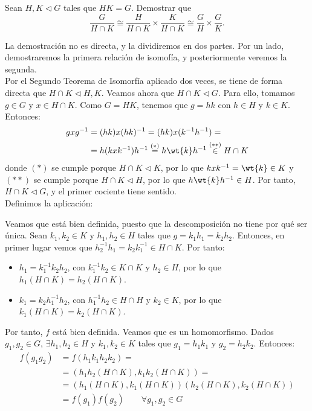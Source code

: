 \begin{ejercicio}
    Sean $H,K\lhd G$ tales que $HK=G$. Demostrar que
    \[
        \frac{G}{H\cap K}\cong \frac{H}{H\cap K}\times \frac{K}{H\cap K}\cong \frac{G}{H}\times \frac{G}{K}.
    \]

    La demostración no es directa, y la dividiremos en dos partes. Por un lado, demostraremos la primera relación de isomofía, y posteriormente veremos la segunda.\\

    Por el Segundo Teorema de Isomorfía aplicado dos veces, se tiene de forma directa que $H\cap K\lhd H,K$. Veamos ahora que $H\cap K\lhd G$. Para ello, tomamos $g\in G$ y $x\in H\cap K$. Como $G=HK$, tenemos que $g=hk$ con $h\in H$ y $k\in K$. Entonces:
    \begin{align*}
        gxg^{-1} &= (hk)x(hk)^{-1} = (hk)x(k^{-1}h^{-1}) =\\&= h(kxk^{-1})h^{-1} \stackrel{(\ast)}{=} h\wt{k}h^{-1}\stackrel{(\ast\ast)}{\in} H\cap K
    \end{align*}
    donde $(\ast)$ se cumple porque $H\cap K\lhd K$, por lo que $kxk^{-1}=\wt{k}\in K$ y $(\ast\ast)$ se cumple porque $H\cap K\lhd H$, por lo que $h\wt{k}h^{-1}\in H$. Por tanto, $H\cap K\lhd G$, y el primer cociente tiene sentido.\\

    Definimos la aplicación:

    Veamos que está bien definida, puesto que la descomposición no tiene por qué ser única. Sean $k_1,k_2\in K$ y $h_1,h_2\in H$ tales que $g=k_1h_1=k_2h_2$. Entonces, en primer lugar vemos que $h_2^{-1}h_1 = k_2k_1^{-1}\in H\cap K$. Por tanto:
    \begin{itemize}
        \item $h_1=k_1^{-1}k_2h_2$, con $k_1^{-1}k_2\in K\cap K$ y $h_2\in H$, por lo que $h_1(H\cap K)=h_2(H\cap K)$.
        \item $k_1=k_2h_1^{-1}h_2$, con $h_1^{-1}h_2\in H\cap H$ y $k_2\in K$, por lo que $k_1(H\cap K)=k_2(H\cap K)$.
    \end{itemize}
    Por tanto, $f$ está bien definida. Veamos que es un homomorfismo.
    Dados $g_1,g_2\in G$, $\exists h_1,h_2\in H$ y $k_1,k_2\in K$ tales que $g_1=h_1k_1$ y $g_2=h_2k_2$. Entonces:
    \begin{align*}
        f(g_1g_2) &= f(h_1k_1h_2k_2) =\\&= (h_1h_2(H\cap K),k_1k_2(H\cap K)) =\\&= (h_1(H\cap K),k_1(H\cap K))(h_2(H\cap K),k_2(H\cap K))\\
        &= f(g_1)f(g_2)\qquad \forall g_1,g_2\in G
    \end{align*}


\end{ejercicio}
